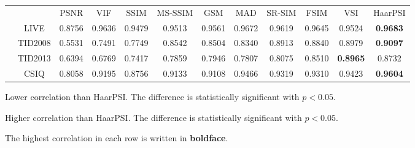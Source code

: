 \documentclass[11pt,a4paper]{article}
\begin{document}
\begin{table}[!htb]
\begin{threeparttable}
\begin{scriptsize}
\begin{tabular}{*{12}{c}}
				& & PSNR & VIF & SSIM & MS-SSIM & GSM & MAD & SR-SIM & FSIM & VSI & HaarPSI\\
				& LIVE & \cellcolor{green!25}0.8756 & 0.9636 & \cellcolor{green!25}0.9479 & \cellcolor{green!25}0.9513 & \cellcolor{green!25}0.9561 & 0.9672 & 0.9619 & 0.9645 & \cellcolor{green!25}0.9524 & \textbf{0.9683}\\
				& TID2008 & \cellcolor{green!25}0.5531 & \cellcolor{green!25}0.7491 & \cellcolor{green!25}0.7749 & \cellcolor{green!25}0.8542 & \cellcolor{green!25}0.8504 & \cellcolor{green!25}0.8340 & \cellcolor{green!25}0.8913 & \cellcolor{green!25}0.8840 & 0.8979 & \textbf{0.9097}\\
				& TID2013 & \cellcolor{green!25}0.6394 & \cellcolor{green!25}0.6769 & \cellcolor{green!25}0.7417 & \cellcolor{green!25}0.7859 & \cellcolor{green!25}0.7946 & \cellcolor{green!25}0.7807 & \cellcolor{green!25}0.8075 & \cellcolor{green!25}0.8510 & \cellcolor{red!25}\textbf{0.8965} & 0.8732\\
				& CSIQ & \cellcolor{green!25}0.8058 & \cellcolor{green!25}0.9195 & \cellcolor{green!25}0.8756 & \cellcolor{green!25}0.9133 & \cellcolor{green!25}0.9108 & \cellcolor{green!25}0.9466 & \cellcolor{green!25}0.9319 & \cellcolor{green!25}0.9310 & \cellcolor{green!25}0.9423 & \textbf{0.9604}\\\midrule[0.5mm]
			\end{tabular}
			\begin{tablenotes}
				\item \colorbox{green!25}{Lower correlation than HaarPSI. The difference is statistically significant with $p < 0.05$.}
				\item \colorbox{red!25}{Higher correlation than HaarPSI. The difference is statistically significant with $p < 0.05$.}
				\item The highest correlation in each row is written in \textbf{boldface}.
			\end{tablenotes}
	\end{scriptsize}
\end{threeparttable}
\end{table}
\end{document}
